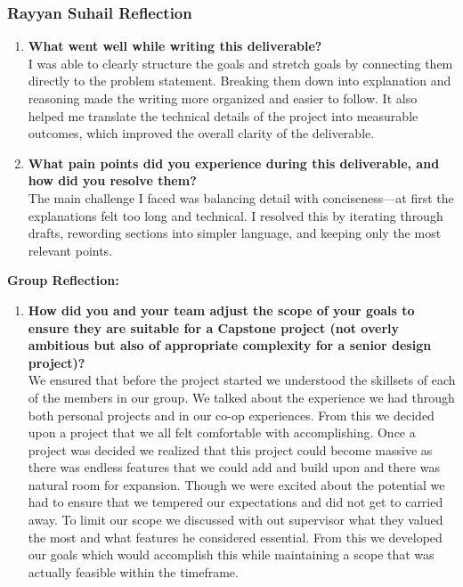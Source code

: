 \documentclass{article}
\begin{document}
\subsubsection*{Rayyan Suhail Reflection}
\begin{enumerate}
    \item \textbf{What went well while writing this deliverable? } \\
    I was able to clearly structure the goals and stretch goals by connecting them directly to the problem statement. Breaking them down into explanation and reasoning made the writing more organized and easier to follow. It also helped me translate the technical details of the project into measurable outcomes, which improved the overall clarity of the deliverable.
    \item \textbf{What pain points did you experience during this deliverable, and how did you resolve them?} \\ 
    The main challenge I faced was balancing detail with conciseness—at first the explanations felt too long and technical. I resolved this by iterating through drafts, rewording sections into simpler language, and keeping only the most relevant points.
    
\end{enumerate} 

\textbf{Group Reflection:}
\begin{enumerate}
    \item \textbf{How did you and your team adjust the scope of your goals to ensure they are suitable for a Capstone project (not overly ambitious but also of appropriate complexity for a senior design project)?} \\
    We ensured that before the project started we understood the skillsets of each of the members in our group. We talked about the experience we had through both personal projects and in our co-op experiences. From this we decided upon a project that we all felt comfortable with accomplishing. Once a project was decided we realized that this project could become massive as there was endless features that we could add and build upon and there was natural room for expansion. Though we were excited about the potential we had to ensure that we tempered our expectations and did not get to carried away. To limit our scope we discussed with out supervisor what they valued the most and what features he considered essential. From this we developed our goals which would accomplish this while maintaining a scope that was actually feasible within the timeframe. 
\end{enumerate} 
\end{document}
